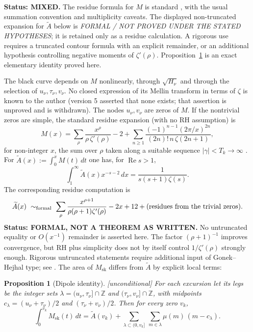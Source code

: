 \documentclass[11pt]{amsart}
\numberwithin{equation}{section}
\theoremstyle{plain}
\newtheorem{proposition}[theorem]{Proposition}
\theoremstyle{definition}
\theoremstyle{remark}
\newcommand{\Msk}{M_{\mathrm{sk}}}
\begin{document}
\noindent\textbf{Status: MIXED.} The residue formula for $M$ is standard
\cite[\S14.27]{Titchmarsh1986}, with the usual summation convention and
multiplicity caveats. The displayed non-truncated expansion for
$\widetilde A$ below is \emph{FORMAL / NOT PROVED UNDER THE STATED
HYPOTHESES}; it is retained only as a residue calculation. A rigorous use
requires a truncated contour formula with an explicit remainder, or an
additional hypothesis controlling negative moments of $\zeta'(\rho)$.
Proposition~\ref{prop:dipoles} is an exact elementary identity proved here.

\medskip

The black curve depends on $M$ nonlinearly, through $\sqrt{H_\nu}$ and
through the selection of $u_\nu,\tau_\nu,v_\nu$. No closed expression of its
Mellin transform in terms of $\zeta$ is known to the author (version 5
asserted that none exists; that assertion is unproved and is withdrawn). The nodes $u_\nu,v_\nu$ are zeros of $M$. If the nontrivial zeros are
simple, the standard residue expansion (with no RH assumption) is
\begin{equation}
\label{eq:explicitM}
  M(x)=\sum_{\rho}\frac{x^\rho}{\rho\,\zeta'(\rho)}-2
  +\sum_{n\ge1}\frac{(-1)^{n-1}(2\pi/x)^{2n}}{(2n)!\,n\,\zeta(2n+1)},
\end{equation}
for non-integer $x$, the sum over $\rho$ taken along a suitable sequence
$|\gamma|<T_k\to\infty$ \cite[\S14.27]{Titchmarsh1986}. For
$\widetilde{A}(x):=\int_0^xM(t)\,dt$ one has, for $\operatorname{Re}s>1$,
\begin{equation}
\label{eq:mellin_A}
  \int_1^\infty \widetilde{A}(x)x^{-s-2}\,dx=\frac{1}{s(s+1)\zeta(s)}.
\end{equation}
The corresponding residue computation is
\begin{equation}
\label{eq:explicitA}
  \widetilde{A}(x)\ \sim_{\rm formal}\
  \sum_\rho\frac{x^{\rho+1}}{\rho(\rho+1)\zeta'(\rho)}-2x+12
  +\text{(residues from the trivial zeros)}.
\end{equation}
\textbf{Status: FORMAL, NOT A THEOREM AS WRITTEN.} No untruncated equality
or $O(x^{-1})$ remainder is asserted here. The factor $(\rho+1)^{-1}$
improves convergence, but RH plus simplicity does not by itself control
$1/\zeta'(\rho)$ strongly enough. Rigorous untruncated statements require
additional input of Gonek--Hejhal type; see \cite{Ng2004}. The area of $\Msk$ differs from
$\widetilde{A}$ by explicit local terms:

\begin{proposition}[Dipole identity]
\label{prop:dipoles}
\emph{[unconditional]} For each excursion let its \emph{legs} be the integer
sets $\lambda=(u_\nu,\tau_\nu]\cap\mathbb{Z}$ and $(\tau_\nu,v_\nu]\cap\mathbb{Z}$,
with midpoints $c_\lambda=(u_\nu+\tau_\nu)/2$ and $(\tau_\nu+v_\nu)/2$. Then
for every zero $v_k$,
\begin{equation}
\label{eq:dipoles}
  \int_0^{v_k}\Msk(t)\,dt=\widetilde{A}(v_k)
  +\sum_{\lambda\subset(0,v_k]}\ \sum_{m\in\lambda}\mu(m)\,(m-c_\lambda).
\end{equation}
\end{proposition}
\end{document}
